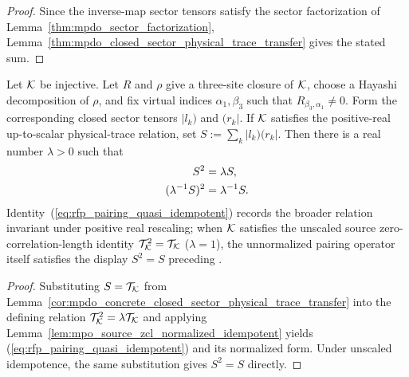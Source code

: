 \begin{proof}
    \leanok
    Since the inverse-map sector tensors satisfy the sector factorization of
    Lemma~\ref{thm:mpdo_sector_factorization},
    Lemma~\ref{thm:mpdo_closed_sector_physical_trace_transfer} gives the
    stated sum.
\end{proof}

\begin{lemma}
    \label{thm:mpdo_closed_sector_pairing_normalized_idempotent}
    \leanok
    Let ${\cal K}$ be injective. Let $R$ and $\rho$ give a three-site
    closure of ${\cal K}$, choose a Hayashi decomposition of $\rho$, and fix
    virtual indices $\alpha_1,\beta_3$ such that
    $R_{\beta_3,\alpha_1}\ne0$. Form the corresponding closed sector
    tensors $|l_k)$ and $(r_k|$. If ${\cal K}$ satisfies the positive-real
    up-to-scalar physical-trace relation, set
    $S:=\sum_k |l_k)(r_k|$. Then there is a real number $\lambda>0$ such that
    \begin{align}
        S^2               & =\lambda S, \label{eq:rfp_pairing_quasi_idempotent} \\
        (\lambda^{-1}S)^2 & =\lambda^{-1}S. \notag
    \end{align}
    Identity~(\ref{eq:rfp_pairing_quasi_idempotent}) records the broader
    relation invariant under positive real rescaling; when ${\cal K}$ satisfies
    the unscaled source zero-correlation-length identity
    $\mathcal T_{\cal K}^2=\mathcal T_{\cal K}$ (\(\lambda=1\)), the
    unnormalized pairing operator itself satisfies the display
    $S^2=S$ preceding
    \cite[Appendix~C.2, Lemma~C.5]{Cirac2016MPDO_arXiv}.
\end{lemma}

\begin{proof}
    \leanok
    Substituting
    $S=\mathcal T_{\cal K}$ from
    Lemma~\ref{cor:mpdo_concrete_closed_sector_physical_trace_transfer}
    into the defining relation
    $\mathcal T_{\cal K}^2=\lambda\mathcal T_{\cal K}$ and applying
    Lemma~\ref{lem:mpo_source_zcl_normalized_idempotent} yields
    (\ref{eq:rfp_pairing_quasi_idempotent}) and its normalized form. Under
    unscaled idempotence, the same substitution gives $S^2=S$ directly.
\end{proof}


